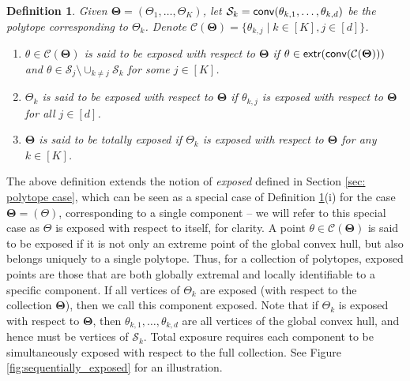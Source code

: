 \documentclass[bj,authoryear]{imsart}
\theoremstyle{plain}
\newtheorem{definition}{Definition}[section]
\theoremstyle{remark}
\def\bTheta{{\boldsymbol\Theta}}
\def\cC{\mathcal{C}}
\def\cS{\mathcal{S}}
\def\conv{{\sf conv}}
\def\extr{{\sf extr }}
\def\bTheta{\boldsymbol{\Theta}}
\begin{document}
\begin{definition}\label{def:exposed}
 Given $\bTheta=(\Theta_1,\dots,\Theta_K)$, let $\cS_k=\conv(\theta_{k,1},\dots,\theta_{k,d})$ be the polytope corresponding to $\Theta_k$. Denote $\cC(\bTheta)=\{\theta_{k,j}\mid k\in[K], j\in [d]\}$.
\begin{enumerate}[label=(\roman*)]
    \item $\theta\in \cC(\bTheta)$ is said to be exposed with respect to $\bTheta$ if $\theta\in \extr(\conv(\cC(\bTheta)))$ and $\theta\in \cS_j\setminus \cup_{k\neq j} \cS_k$ for some $j\in[K]$.
    \item $\Theta_k$ is said to be exposed with respect to $\bTheta$ if $\theta_{k,j}$ is exposed with respect to $\bTheta$ for all $j\in[d]$.
    \item $\bTheta$ is said to be totally exposed if $\Theta_k$ is exposed with respect to $\bTheta$ for any $k\in[K]$.
\end{enumerate}
\end{definition}

The above definition extends the notion of \textit{exposed} defined in Section \ref{sec: polytope case}, which can be seen as a special case of Definition \ref{def:exposed}(i) for the case $\bTheta=(\Theta)$, corresponding to a single component -- we will refer to this special case as $\Theta$ is exposed with respect to itself, for clarity. A point $\theta\in \cC(\bTheta)$ is said to be exposed if it is not only an extreme point of the global convex hull, but also belongs uniquely to a single polytope. Thus, for a collection of polytopes, exposed points are those that are both globally extremal and locally identifiable to a specific component. If all vertices of $\Theta_k$ are exposed (with respect to the collection $\bTheta$), then we call this component exposed. Note that if $\Theta_k$ is exposed with respect to $\bTheta$, then $\theta_{k,1},\dots,\theta_{k,d}$ are all vertices of the global convex hull, and hence must be vertices of $\cS_k$. 
Total exposure requires each component to be simultaneously exposed with respect to the full collection. See Figure \ref{fig:sequentially_exposed} for an illustration.
\end{document}
